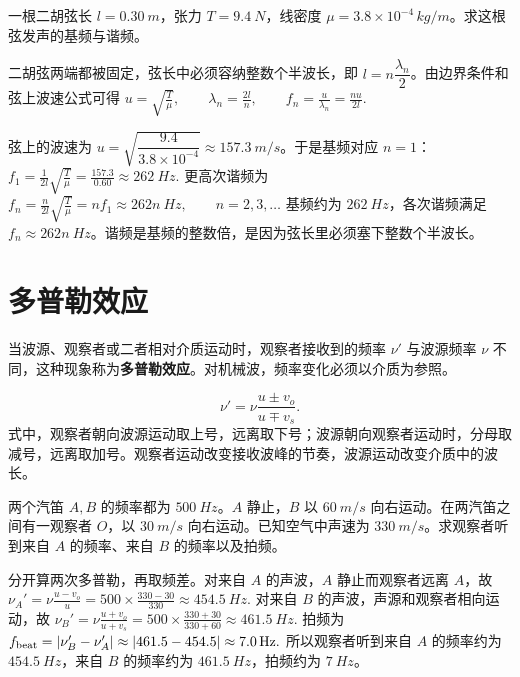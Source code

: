 \documentclass[lang=cn,11pt]{elegantbook}
\begin{document}
\begin{exercise}[二胡弦的基频和谐频怎样由边界条件决定]
一根二胡弦长 \(l=\SI{0.30}{m}\)，张力 \(T=\SI{9.4}{N}\)，线密度 \(\mu=3.8\times10^{-4}\,\si{kg/m}\)。求这根弦发声的基频与谐频。
\end{exercise}

\begin{solution}
二胡弦两端都被固定，弦长中必须容纳整数个半波长，即 \(l=n\dfrac{\lambda_n}{2}\)。由边界条件和弦上波速公式可得
 \(u=\sqrt{\frac{T}{\mu}},\qquad \lambda_n=\frac{2l}{n},\qquad f_n=\frac{u}{\lambda_n}=\frac{nu}{2l}.\) 

弦上的波速为 \(u=\sqrt{\dfrac{9.4}{3.8\times10^{-4}}}\approx \SI{157.3}{m/s}\)。于是基频对应 \(n=1\)：
 \(f_1=\frac{1}{2l}\sqrt{\frac{T}{\mu}} =\frac{157.3}{0.60} \approx \SI{262}{Hz}.\) 
更高次谐频为
 \(f_n=\frac{n}{2l}\sqrt{\frac{T}{\mu}} =n f_1 \approx 262n\ \si{Hz},\qquad n=2,3,\dots\) 
基频约为 \(\SI{262}{Hz}\)，各次谐频满足 \(f_n\approx 262n\ \si{Hz}\)。谐频是基频的整数倍，是因为弦长里必须塞下整数个半波长。
\end{solution}

\section{多普勒效应}

\begin{definition}[多普勒效应]
当波源、观察者或二者相对介质运动时，观察者接收到的频率 \(\nu'\) 与波源频率 \(\nu\) 不同，这种现象称为\textbf{多普勒效应}。对机械波，频率变化必须以介质为参照。

\[
\nu'=\nu\frac{u\pm v_o}{u\mp v_s}.
\]
式中，观察者朝向波源运动取上号，远离取下号；波源朝向观察者运动时，分母取减号，远离取加号。观察者运动改变接收波峰的节奏，波源运动改变介质中的波长。
\end{definition}

\begin{exercise}[两个汽笛同时发声时怎样判出拍频]
两个汽笛 \(A,B\) 的频率都为 \(\SI{500}{Hz}\)。\(A\) 静止，\(B\) 以 \(\SI{60}{m/s}\) 向右运动。在两汽笛之间有一观察者 \(O\)，以 \(\SI{30}{m/s}\) 向右运动。已知空气中声速为 \(\SI{330}{m/s}\)。求观察者听到来自 \(A\) 的频率、来自 \(B\) 的频率以及拍频。
\end{exercise}

\begin{solution}
分开算两次多普勒，再取频差。对来自 \(A\) 的声波，\(A\) 静止而观察者远离 \(A\)，故
 \(\nu_A'=\nu\frac{u-v_o}{u} =500\times\frac{330-30}{330} \approx \SI{454.5}{Hz}.\) 
对来自 \(B\) 的声波，声源和观察者相向运动，故
 \(\nu_B'=\nu\frac{u+v_o}{u+v_s} =500\times\frac{330+30}{330+60} \approx \SI{461.5}{Hz}.\) 
拍频为
 \(f_{\text{beat}}=\abs{\nu_B'-\nu_A'} \approx \abs{461.5-454.5} \approx \SI{7.0}{Hz}.\) 
所以观察者听到来自 \(A\) 的频率约为 \(\SI{454.5}{Hz}\)，来自 \(B\) 的频率约为 \(\SI{461.5}{Hz}\)，拍频约为 \(\SI{7}{Hz}\)。
\end{solution}
\end{document}
